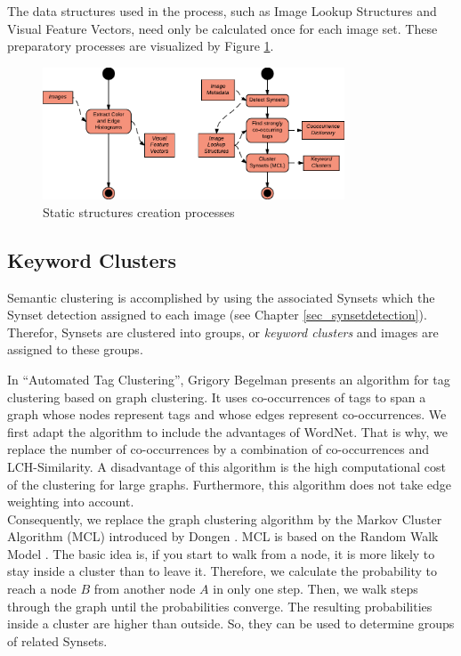 The data structures used in the process, such as Image Lookup Structures and Visual Feature Vectors, need only be calculated once for each image set. These preparatory processes are visualized by Figure \ref{fig_precalcprocess}.

\begin{figure}[h]
\centering
\includegraphics[width=0.8\textwidth]{images/precalcs_activity_diagram.pdf}
\caption{Static structures creation processes}
\label{fig_precalcprocess}
\end{figure}


\subsection{Keyword Clusters}
\label{sec_keywordclustering}

Semantic clustering is accomplished by using the associated Synsets which the Synset detection assigned to each image (see Chapter \ref{sec_synsetdetection}). Therefor, Synsets are clustered into groups, or \emph{keyword clusters} and images are assigned to these groups.

\bigskip
In ``Automated Tag Clustering''\cite{begelman2006automated}, Grigory Begelman presents an algorithm for tag clustering based on graph clustering. It uses co-occurrences of tags to span a graph whose nodes represent tags and whose edges represent co-occurrences. We first adapt the algorithm to include the advantages of WordNet. That is why, we replace the number of co-occurrences by a combination of co-occurrences and LCH-Similarity.
A disadvantage of this algorithm is the high computational cost of the clustering for large graphs. Furthermore, this algorithm does not take edge weighting into account. \\
Consequently, we replace the graph clustering algorithm by the Markov Cluster Algorithm (MCL) introduced by Dongen \cite{Dongen1998}. MCL is based on the Random Walk Model \cite{spitzer2001principles}. The basic idea is, if you start to walk from a node, it is more likely to stay inside a cluster than to leave it. Therefore, we calculate the probability to reach a node $B$ from another node $A$ in only one step. Then, we walk steps through the graph until the probabilities converge. The resulting probabilities inside a cluster are higher than outside. So, they can be used to determine groups of related Synsets.

